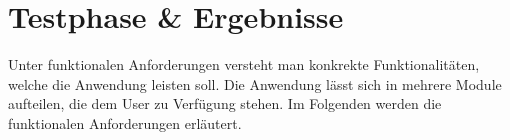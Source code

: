 %
%
%
\chapter{Testphase \& Ergebnisse}
\label{cha:testphase}
%
Unter funktionalen Anforderungen versteht man konkrekte Funktionalitäten, welche die Anwendung leisten soll. Die Anwendung lässt sich in mehrere Module aufteilen, die dem User zu Verfügung stehen. Im Folgenden werden die funktionalen Anforderungen erläutert.